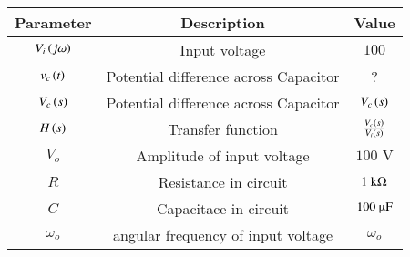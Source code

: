 \begin{tabular}{|c|c|c|}
    \hline
    \textbf{Parameter} & \textbf{Description} & \textbf{Value} \\
    \hline
    $V_i\left(j\omega\right)$ & Input voltage & $ 100$\\
    \hline
    $v_c\left(t\right)$ & Potential difference across Capacitor & ? \\
    \hline
    $V_c\left(s\right)$ & Potential difference across Capacitor & $V_c\left(s\right)$ \\
    \hline
    $H\left(s\right)$ & Transfer function & $ \frac{V_c\left(s\right)}{V_i\left(s\right)}$ \\
    \hline
    $ V_o$ & Amplitude of input voltage & $ 100 \text{ V}$\\
    \hline
    $R$ & Resistance in circuit & $ 1\text{ k\ohm}$ \\
    \hline
    $C$ & Capacitace in circuit & $ 100 \text{ \micro F}$ \\
    \hline
    $\omega_o$ & angular frequency of input voltage& $ \omega_o$\\
    \hline
\end{tabular}




